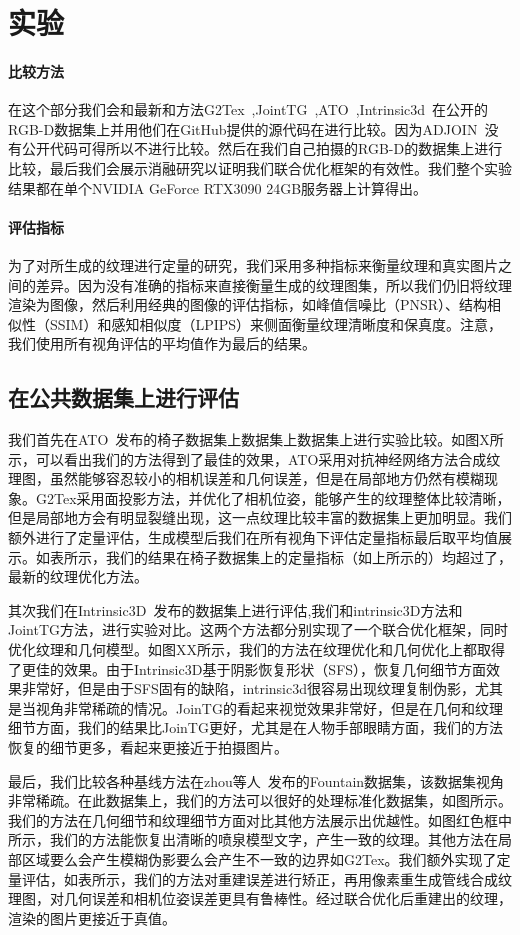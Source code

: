 \section{实验}
\paragraph*{比较方法}
在这个部分我们会和最新和方法G2Tex~\cite{fu2018texture},JointTG~\cite{YanpingFu2020JointTA},ATO~\cite{JingweiHuang2020AdversarialTO},Intrinsic3d~\cite{RobertMaier2017Intrinsic3DH3}在公开的RGB-D数据集上并用他们在GitHub提供的源代码在进行比较。因为ADJOIN~\cite{9705143}没有公开代码可得所以不进行比较。然后在我们自己拍摄的RGB-D的数据集上进行比较，最后我们会展示消融研究以证明我们联合优化框架的有效性。我们整个实验结果都在单个NVIDIA GeForce RTX3090 24GB服务器上计算得出。


\paragraph*{评估指标}
为了对所生成的纹理进行定量的研究，我们采用多种指标来衡量纹理和真实图片之间的差异。因为没有准确的指标来直接衡量生成的纹理图集，所以我们仍旧将纹理渲染为图像，然后利用经典的图像的评估指标，如峰值信噪比（PNSR）、结构相似性（SSIM）和感知相似度（LPIPS）来侧面衡量纹理清晰度和保真度。注意，我们使用所有视角评估的平均值作为最后的结果。
\subsection{在公共数据集上进行评估}
我们首先在ATO~\cite{JingweiHuang2020AdversarialTO}发布的椅子数据集上数据集上数据集上进行实验比较。如图X所示，可以看出我们的方法得到了最佳的效果，ATO采用对抗神经网络方法合成纹理图，虽然能够容忍较小的相机误差和几何误差，但是在局部地方仍然有模糊现象。G2Tex采用面投影方法，并优化了相机位姿，能够产生的纹理整体比较清晰，但是局部地方会有明显裂缝出现，这一点纹理比较丰富的数据集上更加明显。我们额外进行了定量评估，生成模型后我们在所有视角下评估定量指标最后取平均值展示。如表所示，我们的结果在椅子数据集上的定量指标（如上所示的）均超过了，最新的纹理优化方法。\par
其次我们在Intrinsic3D~\cite{RobertMaier2017Intrinsic3DH3}发布的数据集上进行评估,我们和intrinsic3D方法和JointTG方法，进行实验对比。这两个方法都分别实现了一个联合优化框架，同时优化纹理和几何模型。如图XX所示，我们的方法在纹理优化和几何优化上都取得了更佳的效果。由于Intrinsic3D基于阴影恢复形状（SFS），恢复几何细节方面效果非常好，但是由于SFS固有的缺陷，intrinsic3d很容易出现纹理复制伪影，尤其是当视角非常稀疏的情况。JoinTG的看起来视觉效果非常好，但是在几何和纹理细节方面，我们的结果比JoinTG更好，尤其是在人物手部眼睛方面，我们的方法恢复的细节更多，看起来更接近于拍摄图片。\par
最后，我们比较各种基线方法在zhou等人~\cite{Zhou2018}发布的Fountain数据集，该数据集视角非常稀疏。在此数据集上，我们的方法可以很好的处理标准化数据集，如图所示。我们的方法在几何细节和纹理细节方面对比其他方法展示出优越性。如图红色框中所示，我们的方法能恢复出清晰的喷泉模型文字，产生一致的纹理。其他方法在局部区域要么会产生模糊伪影要么会产生不一致的边界如G2Tex。我们额外实现了定量评估，如表所示，我们的方法对重建误差进行矫正，再用像素重生成管线合成纹理图，对几何误差和相机位姿误差更具有鲁棒性。经过联合优化后重建出的纹理，渲染的图片更接近于真值。\par
